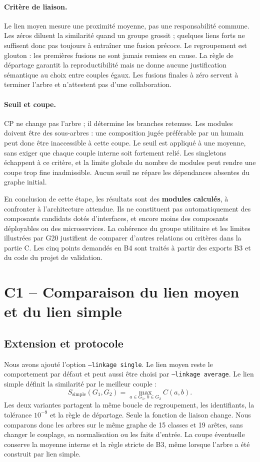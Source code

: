 \documentclass[11pt,a4paper]{article}
\begin{document}
\paragraph{Critère de liaison.}
Le lien moyen mesure une proximité moyenne, pas une responsabilité commune.
Les zéros diluent la similarité quand un groupe grossit ; quelques liens forts
ne suffisent donc pas toujours à entraîner une fusion précoce. Le regroupement
est glouton : les premières fusions ne sont jamais remises en cause. La règle
de départage garantit la reproductibilité mais ne donne aucune justification
sémantique au choix entre couples égaux. Les fusions finales à zéro servent
à terminer l'arbre et n'attestent pas d'une collaboration.

\paragraph{Seuil et coupe.}
CP ne change pas l'arbre ; il détermine les branches retenues. Les modules
doivent être des sous-arbres : une composition jugée préférable par un humain
peut donc être inaccessible à cette coupe. Le seuil est appliqué à une moyenne,
sans exiger que chaque couple interne soit fortement relié. Les singletons
échappent à ce critère, et la limite globale du nombre de modules peut rendre
une coupe trop fine inadmissible. Aucun seuil ne répare les dépendances absentes
du graphe initial.

En conclusion de cette étape, les résultats sont des \textbf{modules calculés},
à confronter à l'architecture attendue. Ils ne constituent pas automatiquement
des composants candidats dotés d'interfaces, et encore moins des composants
déployables ou des microservices. La cohérence du groupe utilitaire et les
limites illustrées par G20 justifient de comparer d'autres relations ou
critères dans la partie C. Les cinq points demandés en B4 sont traités à partir
des exports B3 et du code du projet de validation.

\section{C1 -- Comparaison du lien moyen et du lien simple}
\subsection{Extension et protocole}
Nous avons ajouté l'option \texttt{--linkage single}. Le lien moyen reste le
comportement par défaut et peut aussi être choisi par \texttt{--linkage average}.
Le lien simple définit la similarité par le meilleur couple :
\[
S_{\mathrm{simple}}(G_1,G_2)=\max_{a\in G_1,\,b\in G_2}C(a,b).
\]
Les deux variantes partagent la même boucle de regroupement, les identifiants,
la tolérance $10^{-9}$ et la règle de départage. Seule la fonction de liaison
change. Nous comparons donc les arbres sur le même graphe de 15 classes et
19 arêtes, sans changer le couplage, sa normalisation ou les faits d'entrée.
La coupe éventuelle conserve la moyenne interne et la règle stricte de B3,
même lorsque l'arbre a été construit par lien simple.
\end{document}
